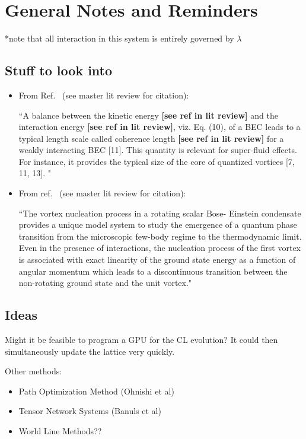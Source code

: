 \documentclass[../RotatingBosons.tex]{subfiles}
\begin{document}
\section{General Notes and Reminders}
*note that all interaction in this system is entirely governed by $\lambda$
\subsection{Stuff to look into}
\begin{itemize}
	\item From Ref.~\cite{1903.08672} (see master lit review for citation):

``A balance between the kinetic energy  {\bf [see ref in lit review]} and the interaction energy  {\bf [see ref in lit review]}, viz. Eq. (10), of a BEC leads to a typical length scale called coherence length {\bf [see ref in lit review]} for a weakly interacting BEC [11]. This
quantity is relevant for super-fluid effects. For instance, it provides the typical size of the core of quantized vortices [7, 11, 13]. "

	\item From ref.~\cite{2019arXiv191011461E} (see master lit review for citation):
	
``The vortex nucleation process in a rotating scalar Bose- Einstein condensate provides a unique model system to study the emergence of a quantum phase transition from the microscopic few-body regime to the thermodynamic limit. Even in the presence of interactions, the nucleation process of the first vortex is associated with exact linearity of the ground state energy as a function of angular momentum which leads to a discontinuous transition between the non-rotating ground state and the unit vortex."

\end{itemize}

\subsection{Ideas}
Might it be feasible to program a GPU for the CL evolution? It could then simultaneously update the lattice very quickly.

Other methods:
\begin{itemize}
	\item Path Optimization Method (Ohnishi et al)
	\item Tensor Network Systems (Banuls et al)
	\item World Line Methods??
\end{itemize}
\end{document}
